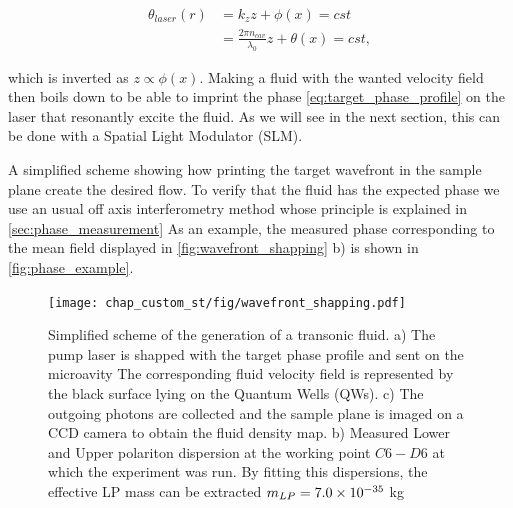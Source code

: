 \begin{equation}
    \begin{align}
    \theta_{laser}(r)&=k_zz+\phi(x)=cst \\
                      &=\frac{2\pi n_{cav} }{\lambda_0}z+\theta(x)= cst,
    \end{align}
\end{equation}

which is inverted as $z\propto \phi(x)$. Making a fluid with the wanted velocity field then boils down to be able to imprint the phase \autoref{eq:target_phase_profile} on the laser that resonantly excite the fluid. As we will see in the next section, this can be done with a Spatial Light Modulator (SLM). 

 A simplified scheme showing how printing the target wavefront in the sample plane create the desired flow.
To verify that the fluid has the expected phase we use an usual off axis interferometry method whose principle is explained in \autoref{sec:phase_measurement}
As an example, the measured phase corresponding to the mean field displayed in \autoref{fig:wavefront_shapping} b) is shown in \autoref{fig:phase_example}.
 
\begin{figure}
    \centering
    \texttt{[image: chap\_custom\_st/fig/wavefront\_shapping.pdf]}
    \caption{Simplified scheme of the generation of a transonic fluid. a) The pump laser is shapped with the target phase profile and sent on the microavity The corresponding fluid velocity field is represented by the black surface lying on the Quantum Wells (QWs). c) The outgoing photons are collected and the sample 
    plane is imaged on a CCD camera to obtain the fluid density map.  b) Measured Lower and Upper polariton dispersion at the working point $C6-D6$ at which the experiment was run. By fitting this dispersions,
    the effective LP mass can be extracted $m_{LP}= 7.0 \times 10^{-35}$ kg}
    \label{fig:wavefront_shapping}
\end{figure}


\bigskip 

